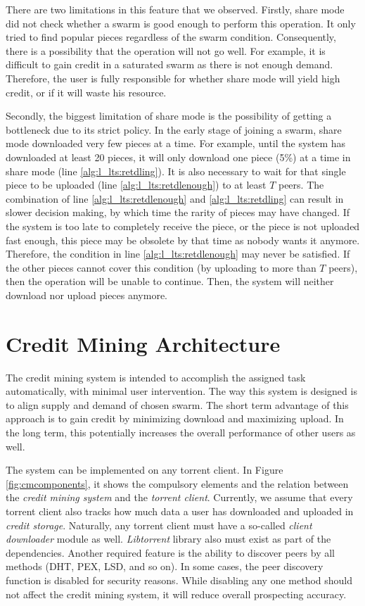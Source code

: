 There are two limitations in this feature that we observed. Firstly, share mode did not check whether a swarm is good enough to perform this operation. It only tried to find popular pieces regardless of the swarm condition. Consequently, there is a possibility that the operation will not go well. For example, it is difficult to gain credit in a saturated swarm as there is not enough demand. Therefore, the user is fully responsible for whether share mode will yield high credit, or if it will waste his resource.

Secondly, the biggest limitation of share mode is the possibility of getting a bottleneck due to its strict policy. In the early stage of joining a swarm, share mode downloaded very few pieces at a time. For example, until the system has downloaded at least 20 pieces, it will only download one piece (5\%) at a time in share mode (line \ref{alg:l_lts:retdling}). It is also necessary to wait for that single piece to be uploaded (line \ref{alg:l_lts:retdlenough}) to at least $T$ peers. The combination of line \ref{alg:l_lts:retdlenough} and \ref{alg:l_lts:retdling} can result in slower decision making, by which time the rarity of pieces may have changed. If the system is too late to completely receive the piece, or the piece is not uploaded fast enough, this piece may be obsolete by that time as nobody wants it anymore. Therefore, the condition in line \ref{alg:l_lts:retdlenough} may never be satisfied. If the other pieces cannot cover this condition (by uploading to more than $T$ peers), then the operation will be unable to continue. Then, the system will neither download nor upload pieces anymore.

\section{Credit Mining Architecture}
\label{section:cmcomponents}

The credit mining system is intended to accomplish the assigned task automatically, with minimal user intervention. The way this system is designed is to align supply and demand of chosen swarm. The short term advantage of this approach is to gain credit by minimizing download and maximizing upload. In the long term, this potentially increases the overall performance of other users as well.

The system can be implemented on any torrent client. In Figure \ref{fig:cmcomponents}, it shows the compulsory elements and the relation between the \textit{credit mining system} and the \textit{torrent client}. Currently, we assume that every torrent client also tracks how much data a user has downloaded and uploaded in \textit{credit storage}. Naturally, any torrent client must have a so-called \textit{client downloader} module as well. \textit{Libtorrent} library also must exist as part of the dependencies. Another required feature is the ability to discover peers by all methods (DHT, PEX, LSD, and so on). In some cases, the peer discovery function is disabled for security reasons. While disabling any one method should not affect the credit mining system, it will reduce overall prospecting accuracy.

